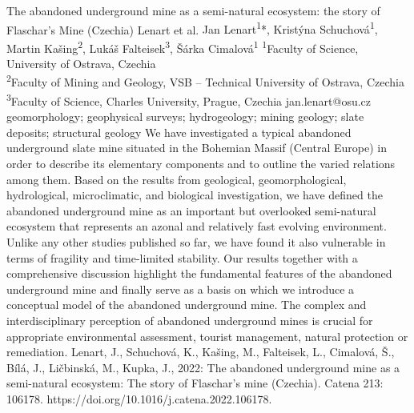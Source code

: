 \abstract
{The abandoned underground mine as a semi-natural ecosystem: the story of Flaschar's Mine (Czechia)} 
{Lenart et al.} 
{Jan Lenart\textsuperscript{1}*, Kristýna Schuchová\textsuperscript{1}, Martin Kašing\textsuperscript{2}, Lukáš Falteisek\textsuperscript{3}, Šárka Cimalová\textsuperscript{1}} 
{\TLtag} 
{
\textsuperscript{1}Faculty of Science, University of Ostrava, Czechia\\
\textsuperscript{2}Faculty of Mining and Geology, VSB – Technical University of Ostrava, Czechia\\
\textsuperscript{3}Faculty of Science, Charles University, Prague, Czechia
}
{jan.lenart@osu.cz}  %
{geomorphology; geophysical surveys; hydrogeology; mining geology; slate deposits; structural geology}
{We have investigated a typical abandoned underground slate mine situated in the Bohemian Massif (Central Europe) in order to describe its elementary components and to outline the varied relations among them. Based on the results from geological, geomorphological, hydrological, microclimatic, and biological investigation, we have defined the abandoned underground mine as an important but overlooked semi-natural ecosystem that represents an azonal and relatively fast evolving environment. Unlike any other studies published so far, we have found it also vulnerable in terms of fragility and time-limited stability. Our results together with a comprehensive discussion highlight the fundamental features of the abandoned underground mine and finally serve as a basis on which we introduce a conceptual model of the abandoned underground mine. The complex and interdisciplinary perception of abandoned underground mines is crucial for appropriate environmental assessment, tourist management, natural protection or remediation.
}
{Lenart, J., Schuchová, K., Kašing, M., Falteisek, L., Cimalová, Š., Bílá, J., Ličbinská, M., Kupka, J., 2022: The abandoned underground mine as a semi-natural ecosystem: The story of Flaschar's mine (Czechia). Catena 213: 106178. https://doi.org/10.1016/j.catena.2022.106178.
}


